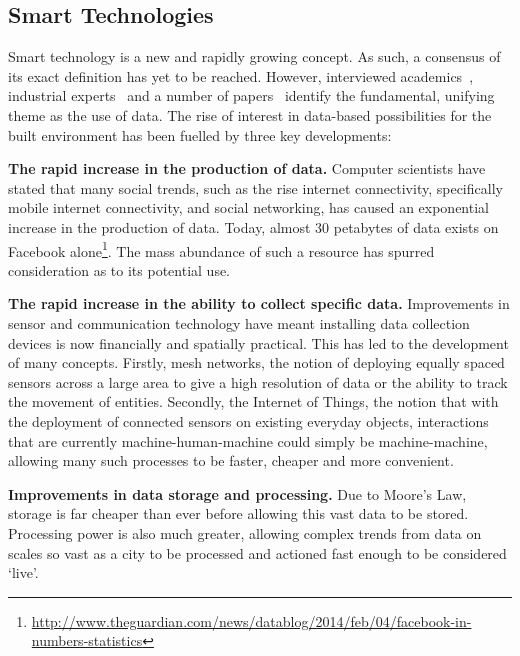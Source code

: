 \documentclass[conference]{IEEEtran}
\begin{document}
\subsection{Smart Technologies}

Smart technology is a new and rapidly growing concept. As such, a
consensus of its exact definition has yet to be reached. However,
interviewed academics~\cite{elecgen:2013}, industrial
experts~\cite{buscher:2014} and a number of
papers~\cite{komninos:2002,arup-et-al:2011,harrison+abbottdonnelly:2011,batty-et-al:2012}
identify the fundamental, unifying theme as the use of data. The rise
of interest in data-based possibilities for the built environment has
been fuelled by three key developments:

\begin{compactenum}
\item {\textbf{The rapid increase in the production of data.}}
  Computer scientists have stated that many social trends, such as the
  rise internet connectivity, specifically mobile internet
  connectivity, and social networking, has caused an exponential
  increase in the production of data. Today, almost 30 petabytes of
  data exists on Facebook alone\footnote{\url{http://www.theguardian.com/news/datablog/2014/feb/04/facebook-in-numbers-statistics}}. The mass abundance of such a
  resource has spurred consideration as to its potential use.
\item {\textbf{The rapid increase in the ability to collect specific
      data.}} Improvements in sensor and communication technology have
  meant installing data collection devices is now financially and
  spatially practical. This has led to the development of many
  concepts. Firstly, mesh networks, the notion of deploying equally
  spaced sensors across a large area to give a high resolution of data
  or the ability to track the movement of entities. Secondly, the
  Internet of Things, the notion that with the deployment of
  connected sensors on existing everyday objects, interactions that
  are currently machine-human-machine could simply be machine-machine,
  allowing many such processes to be faster, cheaper and  more
  convenient. 
\item {\textbf{Improvements in data storage and processing.}} Due to
  Moore’s Law, storage is far cheaper than ever before allowing
  this vast data to be stored. Processing power is also much greater,
  allowing complex trends from data on scales so vast as a city to be
  processed and actioned fast enough to be considered `live'.
\end{compactenum}
\end{document}
